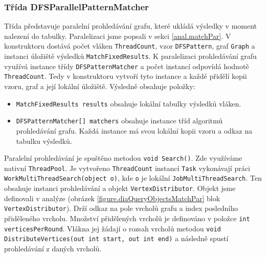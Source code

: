 \subsubsection{Třída DFSParallelPatternMatcher} \label{impl.match.parmatch}

Třída představuje paralelní prohledávání grafu, které ukládá výsledky v moment nalezení do tabulky.
Paralelizaci jsme popsali v sekci \ref{anal.matchPar}.
V konstruktoru dostává počet vláken \texttt{ThreadCount}, vzor \texttt{DFSPattern}, graf \texttt{Graph} a instanci úložiště výsledků \texttt{MatchFixedResults}.
K paralelizaci prohledávání grafu využívá instance třídy \texttt{DFSPatternMatcher} a počet instancí odpovídá hodnotě \texttt{ThreadCount}.
Tedy v konstruktoru vytvoří tyto instance a každé přidělí kopii vzoru, graf a její lokální úložiště.
Výsledně obsahuje položky:
\begin{itemize}
\item \texttt{MatchFixedResults results} obsahuje lokální tabulky výsledků vláken.
\item \texttt{DFSPatternMatcher[] matchers} obsahuje instance tříd algoritmů prohledávání grafu.
Každá instance má svou lokální kopii vzoru a odkaz na tabulku výsledků.
\end{itemize}
Paralelní prohledávání je spuštěno metodou \texttt{void Search()}.
Zde využíváme nativní \texttt{ThreadPool}.
Je vytvořeno \texttt{ThreadCount} instancí \texttt{Task} vykonávají práci \texttt{WorkMultiThreadSearch(object o)}, kde \texttt{o} je lokální \texttt{JobMultiThreadSearch}.
Ten obsahuje instanci prohledávání a objekt \texttt{VertexDistributor}.
Objekt jsme definovali v analýze (obrázek \ref{figure.diaQueryObjectsMatchPar} blok \texttt{VertexDistributor}).
Drží odkaz na pole vrcholů grafu a index posledního přiděleného vrcholu.
Množství přidělených vrcholů je definováno v položce \texttt{int verticesPerRound}.
Vlákna jej žádají o rozsah vrcholů metodou \texttt{void DistributeVertices(out int start, out int end)} a následně spustí prohledávání z daných vrcholů.

